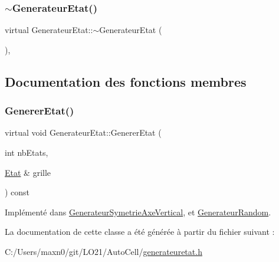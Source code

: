 \mbox{\label{class_generateur_etat_a1ba21b5a12fa8855136363e338209d34}} 
\subsubsection{\texorpdfstring{$\sim$\+Generateur\+Etat()}{~GenerateurEtat()}}
{\footnotesize\ttfamily virtual Generateur\+Etat\+::$\sim$\+Generateur\+Etat (\begin{DoxyParamCaption}{ }\end{DoxyParamCaption})\hspace{0.3cm}{\ttfamily [virtual]}, {\ttfamily [default]}}



\subsection{Documentation des fonctions membres}
\mbox{\label{class_generateur_etat_a0698d6706e0aaa2e597bdaf280806835}} 
\subsubsection{\texorpdfstring{Generer\+Etat()}{GenererEtat()}}
{\footnotesize\ttfamily virtual void Generateur\+Etat\+::\+Generer\+Etat (\begin{DoxyParamCaption}\item[{int}]{nb\+Etats,  }\item[{\mbox{\hyperlink{class_etat}{Etat}} \&}]{grille }\end{DoxyParamCaption}) const\hspace{0.3cm}{\ttfamily [pure virtual]}}



Implémenté dans \mbox{\hyperlink{class_generateur_symetrie_axe_vertical_ae782046a73fc7624212c3c5988de949f}{Generateur\+Symetrie\+Axe\+Vertical}}, et \mbox{\hyperlink{class_generateur_random_ab110072502487c78f0b7dc0c7f2241c7}{Generateur\+Random}}.



La documentation de cette classe a été générée à partir du fichier suivant \+:\begin{DoxyCompactItemize}
\item 
C\+:/\+Users/maxn0/git/\+L\+O21/\+Auto\+Cell/\mbox{\hyperlink{generateuretat_8h}{generateuretat.\+h}}\end{DoxyCompactItemize}
